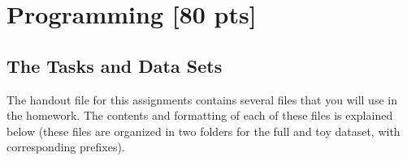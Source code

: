 \documentclass[11pt,addpoints,answers]{exam}
\numberwithin{equation}{section} %
\numberwithin{figure}{section} %
\numberwithin{table}{section} %
\begin{document}
\begin{tcolorbox}[fit,height=10cm, width=17cm, blank, borderline={1pt}{-2pt}]
    \end{tcolorbox}

\clearpage\section{Programming [80 pts]}
\label{programming}

\subsection{The Tasks and Data Sets}\label{dataset}
The handout file for this assignments contains several files that you will use in the homework. The contents and formatting of each of these files is explained below (these files are organized in two folders for the full and toy dataset, with corresponding prefixes).
\end{document}
